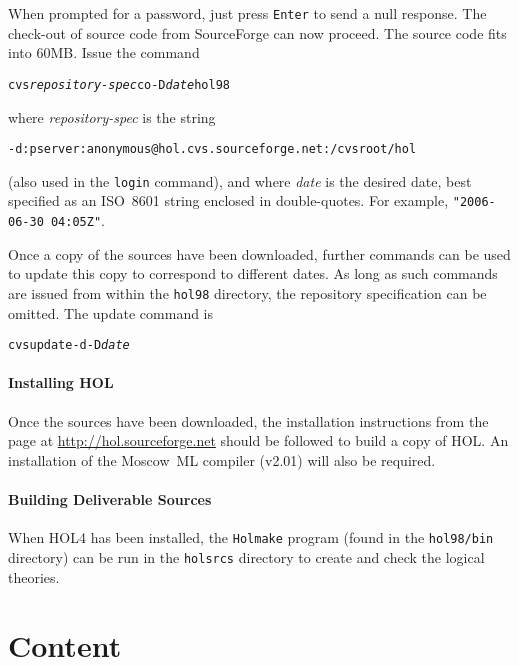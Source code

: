 \documentclass[11pt]{article}
\begin{document}
When prompted for a password, just press \texttt{Enter} to send a null
response.  The check-out of source code from SourceForge can now
proceed.  The source code fits into 60MB.  Issue the command

{\small
\begin{alltt}
   cvs \textit{repository-spec} co -D \textit{date} hol98
\end{alltt}
}

\noindent where \textit{\ttfamily repository-spec} is the string

{\small
\begin{alltt}
   -d:pserver:anonymous@hol.cvs.sourceforge.net:/cvsroot/hol
\end{alltt}
}

\noindent (also used in the \texttt{login} command), and where
\textit{\ttfamily date} is the desired date, best specified as an
ISO~8601 string enclosed in double-quotes.  For example,
\texttt{"2006-06-30 04:05Z"}.

Once a copy of the sources have been downloaded, further commands can
be used to update this copy to correspond to different dates.  As long
as such commands are issued from within the \texttt{hol98} directory,
the repository specification can be omitted.  The update command is

{\small
\begin{alltt}
   cvs update -d -D \textit{date}
\end{alltt}
}

\paragraph{Installing HOL} Once the sources have been downloaded, the
installation instructions from the page at
\url{http://hol.sourceforge.net} should be followed to build a copy of
HOL.  An installation of the Moscow~ML compiler (v2.01) will also be
required.

\paragraph{Building Deliverable Sources}
When HOL4 has been installed, the \texttt{Holmake} program (found in
the \texttt{hol98/bin} directory) can be run in the \texttt{holsrcs}
directory to create and check the logical theories.

\section{Content}
\end{document}
